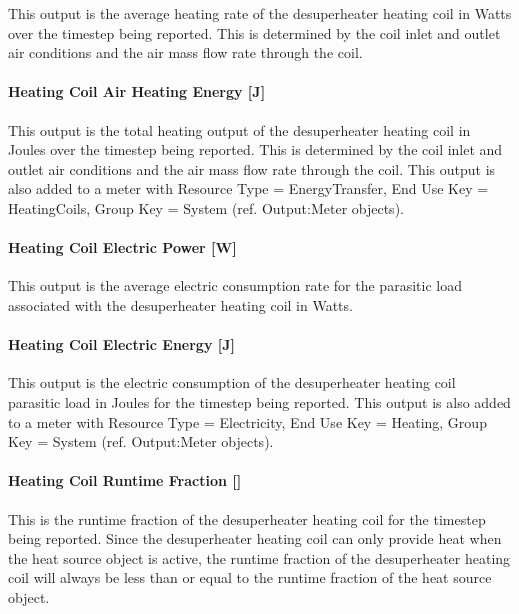 This output is the average heating rate of the desuperheater heating coil in Watts over the timestep being reported. This is determined by the coil inlet and outlet air conditions and the air mass flow rate through the coil.

\paragraph{Heating Coil Air Heating Energy {[}J{]}}\label{heating-coil-air-heating-energy-j-1}

This output is the total heating output of the desuperheater heating coil in Joules over the timestep being reported. This is determined by the coil inlet and outlet air conditions and the air mass flow rate through the coil. This output is also added to a meter with Resource Type = EnergyTransfer, End Use Key = HeatingCoils, Group Key = System (ref. Output:Meter objects).

\paragraph{Heating Coil Electric Power {[}W{]}}\label{heating-coil-electric-power-w-2}

This output is the average electric consumption rate for the parasitic load associated with the desuperheater heating coil in Watts.

\paragraph{Heating Coil Electric Energy {[}J{]}}\label{heating-coil-electric-energy-j-1}

This output is the electric consumption of the desuperheater heating coil parasitic load in Joules for the timestep being reported. This output is also added to a meter with Resource Type = Electricity, End Use Key = Heating, Group Key = System (ref. Output:Meter objects).

\paragraph{Heating Coil Runtime Fraction {[]}}\label{heating-coil-runtime-fraction}

This is the runtime fraction of the desuperheater heating coil for the timestep being reported. Since the desuperheater heating coil can only provide heat when the heat source object is active, the runtime fraction of the desuperheater heating coil will always be less than or equal to the runtime fraction of the heat source object.


